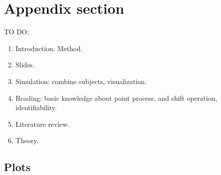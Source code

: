 
\appendix

\section{Appendix section}\label{app}

TO DO:
\begin{enumerate}
\item Introduction. Method.
\item Slides.
\item Simulation: combine subjects, visualization.
\item Reading: basic knowledge about point process, and shift operation, identifiability.
\item Literature review.
\item Theory.
\end{enumerate}

\subsection{Plots}



